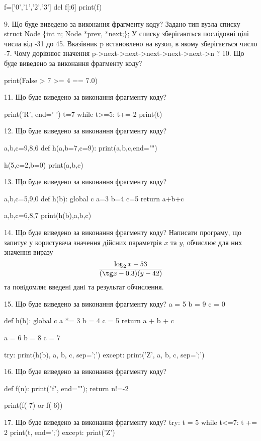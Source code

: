 \documentclass[11pt]{article}
\begin{document}
f=['0','1','2','3']
del f[:6]
print(f)


9. Що буде виведено за виконання фрагменту коду?
Задано тип вузла списку
struct Node \{int n; Node *prev, *next;\};
У списку зберігаються послідовні цілі числа від -31 до 45. Вказівник p встановлено на вузол, в якому зберігається число -7.
Чому дорівнює значення p->next->next->next->next->next->n ?
10. Що буде виведено за виконання фрагменту коду?

print(False > 7 >= 4 == 7.0)

11. Що буде виведено за виконання фрагменту коду?

print('R', end=' ')
t=7
while t>=5:
    t+=-2
print(t)


12. Що буде виведено за виконання фрагменту коду?

a,b,c=9,8,6
def h(a,b=7,c=9):
    print(a,b,c,end="")

h(5,c=2,b=0)
print(a,b,c)


13. Що буде виведено за виконання фрагменту коду?

a,b,c=5,9,0
def h(b):
global c    a=3
    b=4
    c=5
    return a+b+c

a,b,c=6,8,7
print(h(b),a,b,c)

14. Що буде виведено за виконання фрагменту коду?
Написати програму, що запитує у користувача значення дійсних параметрів $x$ та $y$, обчислює для них значення виразу 
$$\frac{\log_{2} x - 53}{(\tg x - 0.3) (y - 42)}$$ 
та повiдомляє введенi данi та результат обчислення.


15. Що буде виведено за виконання фрагменту коду?
a = 5
b = 9
c = 0

def h(b):
global c    a *= 3
    b = 4
    c = 5
    return a + b + c

a = 6
b = 8
c = 7

try:
    print(h(b), a, b, c, sep=';')
except:
    print('Z', a, b, c, sep=';')

16. Що буде виведено за виконання фрагменту коду?

def f(n):
    print("f", end="");
    return n!=-2

print(f(-7) or f(-6))

17. Що буде виведено за виконання фрагменту коду?
try:
    t = 5
    while t<=7:
        t += 2
    print(t, end=';')
except:
    print('Z')
\end{document}
